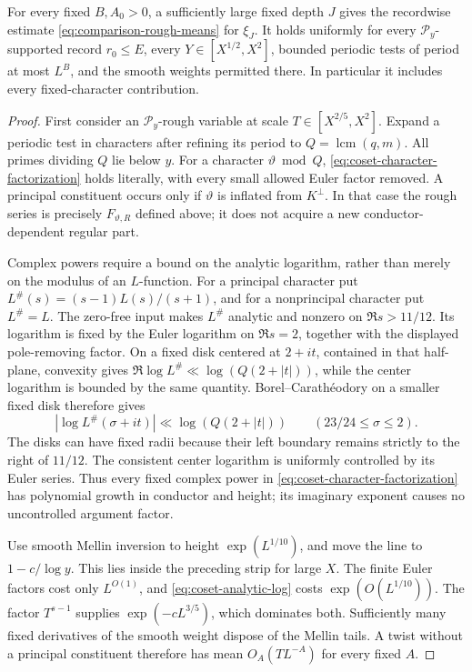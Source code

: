 \begin{lemma}\label{lem:coset-centering}
For every fixed \(B,A_0>0\), a sufficiently large fixed depth \(J\)
gives the recordwise estimate \eqref{eq:comparison-rough-means} for
\(\xi_J\). It holds uniformly for every \(\mathcal P_y\)-supported
record \(r_0\le E\), every \(Y\in[X^{1/2},X^2]\), bounded periodic
tests of period at most \(L^B\), and the smooth weights permitted
there. In particular it includes every fixed-character contribution.
\end{lemma}
\begin{proof}
First consider an \(\mathcal P_y\)-rough variable at scale
\(T\in[X^{2/5},X^2]\). Expand a periodic test in characters after
refining its period to \(Q=\operatorname{lcm}(q,m)\). All primes
dividing \(Q\) lie below \(y\). For a character \(\vartheta\bmod Q\),
\eqref{eq:coset-character-factorization} holds literally, with every
small allowed Euler factor removed. A principal constituent occurs
only if \(\vartheta\) is inflated from \(K^\perp\). In that case
the rough series is precisely \(F_{\vartheta,R}\) defined above;
it does not acquire a new conductor-dependent regular part.

Complex powers require a bound on the analytic logarithm, rather
than merely on the modulus of an \(L\)-function. For a principal
character put
\(L^\#(s)=(s-1)L(s)/(s+1)\), and for a nonprincipal character put
\(L^\#=L\). The zero-free input makes \(L^\#\) analytic and
nonzero on \(\Re s>11/12\). Its logarithm is fixed by the Euler
logarithm on \(\Re s=2\), together with the displayed pole-removing
factor. On a fixed disk centered at \(2+it\), contained in that
half-plane, convexity gives
\(\Re\log L^\#\ll\log(Q(2+|t|))\), while the center logarithm is
bounded by the same quantity. Borel--Carath\'eodory on a smaller
fixed disk therefore gives
\begin{equation}\label{eq:coset-analytic-log}
 |\log L^\#(\sigma+it)|\ll\log(Q(2+|t|))
                  \qquad(23/24\le\sigma\le2).
\end{equation}
The disks can have fixed radii because their left boundary remains
strictly to the right of \(11/12\). The consistent center logarithm
is uniformly controlled by its Euler series. Thus every fixed
complex power in \eqref{eq:coset-character-factorization} has
polynomial growth in conductor and height; its imaginary exponent
causes no uncontrolled argument factor.

Use smooth Mellin inversion to height \(\exp(L^{1/10})\), and move
the line to \(1-c/\log y\). This lies inside the preceding strip
for large \(X\). The finite Euler factors cost only \(L^{O(1)}\),
and \eqref{eq:coset-analytic-log} costs \(\exp(O(L^{1/10}))\).
The factor \(T^{s-1}\) supplies \(\exp(-cL^{3/5})\), which dominates
both. Sufficiently many fixed derivatives of the smooth weight
dispose of the Mellin tails. A twist without a principal constituent
therefore has mean \(O_A(TL^{-A})\) for every fixed \(A\).


\end{proof}
